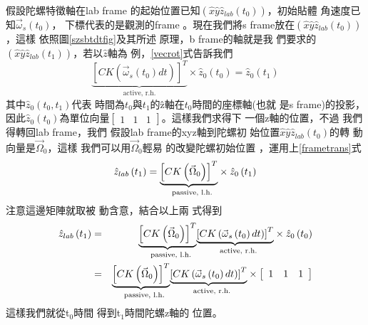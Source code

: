 \documentclass[12pt,a4paper]{article}
\begin{document}
假設陀螺特徵軸在lab frame%
的起始位置已知$\left( \hat{x}\hat{y%
}\hat{z}_{lab}(t_{0})\right) $，初始貼體%
角速度已知$\vec{\omega}_{s}(t_{0})$，%
下標代表的是觀測的frame%
。現在我們將s frame放在$%
\left( \hat{x}\hat{y}\hat{z}_{lab}(t_{0})\right) $，這樣%
依照圖\ref{szsbtdtfig}及其所述%
原理，b frame的軸就是我%
們要求的$\left( \hat{x}\hat{y}\hat{z}%
_{lab}(t_{1})\right) $，若以$\hat{z}$軸為%
例，\ref{vecrot}式告訴我們%
\begin{equation*}
\underset{\text{active, r.h.}}{\underbrace{\left[ CK\left( \vec{\omega}%
_{s}\left( t_{0}\right) dt\right) \right] ^{T}}}\times \hat{z}_{0}\left(
t_{0}\right) =\hat{z}_{0}\left( t_{1}\right)
\end{equation*}%
其中$\hat{z}_{0}\left( t_{0},t_{1}\right) $代表%
時間為$t_{0}$與$t_{1}$的\^{z}軸在$%
t_{0}$時間的座標軸(也就%
是s frame)的投影，因此$\hat{z}%
_{0}\left( t_{0}\right) $為單位向量$\left[ 
\begin{array}{ccc}
1 & 1 & 1%
\end{array}%
\right] $。這樣我們求得下%
一個z軸的位置，不過%
我們得轉回lab frame，我們%
假設lab frame的xyz軸到陀螺初%
始位置$\hat{x}\hat{y}\hat{z}_{lab}(t_{0})$的轉%
動向量是$\vec{\Omega}_{0}， $這樣%
我們可以用$\vec{\Omega}_{0}$輕易%
的改變陀螺初始位置%
，運用上\ref{frametrans}式%
\begin{equation*}
\hat{z}_{lab}\left( t_{1}\right) =\underset{\text{passive, l.h.}}{%
\underbrace{\left[ CK\left( \vec{\Omega}_{0}\right) \right] ^{T}}}\times 
\hat{z}_{0}\left( t_{1}\right)
\end{equation*}%
注意這邊矩陣就取被%
動含意，結合以上兩%
式得到%
\begin{eqnarray*}
\hat{z}_{lab}\left( t_{1}\right) &=&\underset{\text{passive, l.h.}}{%
\underbrace{\left[ CK\left( \vec{\Omega}_{0}\right) \right] ^{T}}}\underset{%
\text{active, r.h.}}{\underbrace{\left[ CK\left( \vec{\omega}_{s}\left(
t_{0}\right) dt\right) \right] ^{T}}}\times \hat{z}_{0}\left( t_{0}\right) \\
&=&\underset{\text{passive, l.h.}}{\underbrace{\left[ CK\left( \vec{\Omega}%
_{0}\right) \right] ^{T}}}\underset{\text{active, r.h.}}{\underbrace{\left[
CK\left( \vec{\omega}_{s}\left( t_{0}\right) dt\right) \right] ^{T}}}\times %
\left[ 
\begin{array}{ccc}
1 & 1 & 1%
\end{array}%
\right]
\end{eqnarray*}%
這樣我們就從t$_{0}$時間%
得到t$_{1}$時間陀螺z軸的%
位置。
\end{document}
